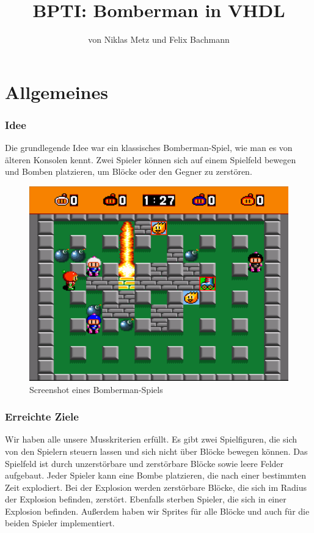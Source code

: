 \documentclass[parskip=full]{scrartcl}
\title{BPTI: Bomberman in VHDL}
\subtitle{von Niklas Metz und Felix Bachmann}
\begin{document}
	\maketitle
	\newpage
	\tableofcontents
	\newpage
	
	\part{Allgemeines}
		\section{Idee}
			Die grundlegende Idee war ein klassisches Bomberman-Spiel, wie man es von älteren Konsolen kennt. Zwei Spieler können sich auf einem Spielfeld bewegen und Bomben platzieren, um Blöcke oder den Gegner zu zerstören.
			\begin{figure}[H]
				\centering
				\includegraphics[scale=0.4]{./bilder/bomberman.png}
				\caption{Screenshot eines Bomberman-Spiels}
			\end{figure}
		
		\section{Erreichte Ziele}
			Wir haben alle unsere Musskriterien erfüllt. Es gibt zwei Spielfiguren, die sich von den Spielern steuern lassen und sich nicht über Blöcke bewegen können. Das Spielfeld ist durch unzerstörbare und  zerstörbare Blöcke sowie leere Felder aufgebaut. Jeder Spieler kann eine Bombe platzieren, die nach einer bestimmten Zeit explodiert. Bei der Explosion werden zerstörbare Blöcke, die sich im Radius der Explosion befinden, zerstört. Ebenfalls sterben Spieler, die sich in einer Explosion befinden. \newline
			Außerdem haben wir Sprites für alle Blöcke und auch für die beiden Spieler implementiert. \newline
			
\end{document}

